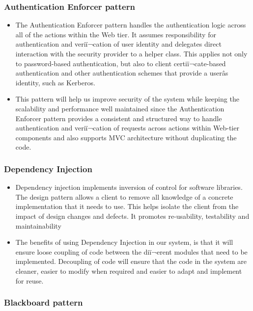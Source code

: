 \documentclass{article}
\begin{document}
		\subsubsection{Authentication Enforcer pattern} %
		
		\begin{itemize}
			\item  The Authentication Enforcer pattern handles the authentication logic across all of the actions 						within the Web tier. It assumes responsibility for authentication and veriï¬cation of user identity and 					delegates direct interaction with the security provider to a helper class. This applies not only to 						password-based authentication, but also to client certiï¬cate-based authentication and other 								authentication schemes that provide a userâs identity, such as Kerberos. 
			\item This pattern will help us improve security of the system while keeping the scalability and 						performance well maintained since the Authentication Enforcer pattern provides a consistent and structured way to handle authentication and veriï¬cation of requests across actions within Web-tier components and also 		supports MVC architecture without duplicating the code.	
		\end{itemize}           
		
		\subsubsection{Dependency Injection} %
		
		\begin{itemize}
			\item  Dependency injection implements inversion of control for software libraries. The design pattern 					allows a client to remove all knowledge of a concrete implementation that it needs to use. This helps 					isolate the client from the impact of design changes and defects. It promotes re-usability, testability 					and maintainability
			\item The benefits of using Dependency Injection in our system, is that it will ensure loose coupling of 				code between the diï¬erent modules that need to be implemented. Decoupling of code will ensure that the 					code in the system are cleaner, easier to modify when required and easier to adapt and implement for reuse.	
		\end{itemize} 
		
		
		\subsubsection{Blackboard pattern} %
		
\end{document}
